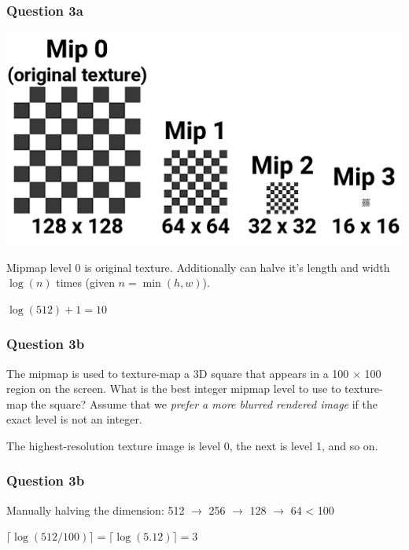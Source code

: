 \documentclass{beamer}
\begin{document}
\begin{frame}
    \frametitle{Question 3a}

    \begin{center}
        \includegraphics[scale=0.45]{mipmap-levels.png}
    \end{center}

    Mipmap level 0 is original texture. Additionally can halve it's length and width $\log(n)$ times
    (given $n = \min(h,w)$).

    \begin{tcolorbox}
        \centering
        $\log(512) + 1 = 10$
    \end{tcolorbox}

\end{frame}

\begin{frame}
    \frametitle{Question 3b}

    The mipmap is used to texture-map a 3D square that appears in a 100 $\times$ 100 region on the screen. 
    What is the best integer mipmap level to use to texture-map the square? 
    Assume that we \textit{prefer a more blurred rendered image} if the exact level is not an integer. 

    \vspace{1em}
    
    The highest-resolution texture image is level 0, the next is level 1, and so on.

\end{frame}

\begin{frame}
    \frametitle{Question 3b}

    Manually halving the dimension: 
    512 $\rightarrow$ 256 $\rightarrow$ 128 $\rightarrow$ 64 < 100

    \begin{tcolorbox}
        \centering
        $\lceil \log(512/100) \rceil = \lceil \log(5.12) \rceil = 3$
    \end{tcolorbox}


\end{frame}
\end{document}
